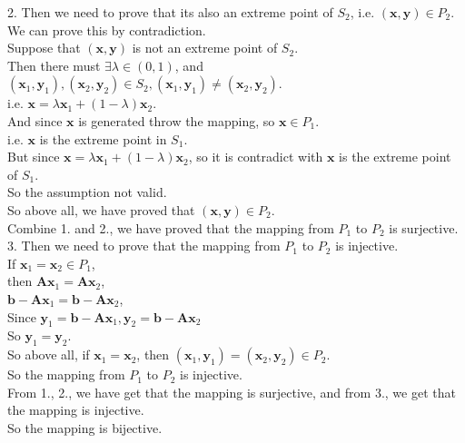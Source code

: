 \documentclass[10pt]{article}
\renewcommand{\mathbf}{\boldsymbol}
\begin{document}
2. Then we need to prove that its also an extreme point of $S_2$, i.e. $(\mathbf{x},\mathbf{y})\in P_2$.\\
We can prove this by contradiction.\\
Suppose that $(\mathbf{x},\mathbf{y})$ is not an extreme point of $S_2$.\\
Then there must $\exists\lambda\in(0,1)$, and $(\mathbf{x}_1,\mathbf{y}_1),(\mathbf{x}_2,\mathbf{y}_2)\in S_2, (\mathbf{x}_1,\mathbf{y}_1)\neq(\mathbf{x}_2,\mathbf{y}_2)$.\\
i.e. $\mathbf{x}=\lambda\mathbf{x}_1+(1-\lambda)\mathbf{x}_2$.\\
And since $\mathbf{x}$ is generated throw the mapping, so $\mathbf{x}\in P_1$.\\
i.e. $\mathbf{x}$ is the extreme point in $S_1$.\\
But since $\mathbf{x}=\lambda\mathbf{x}_1+(1-\lambda)\mathbf{x}_2$, so it is contradict with $\mathbf{x}$ is the extreme point of $S_1$.\\
So the assumption not valid.\\
So above all, we have proved that $(\mathbf{x},\mathbf{y})\in P_2$.\\

Combine 1. and 2., we have proved that the mapping from $P_1$ to $P_2$ is surjective.\\

3. Then we need to prove that the mapping from $P_1$ to $P_2$ is injective.\\
If $\mathbf{x}_1=\mathbf{x}_2\in P_1$,\\
then $\mathbf{A}\mathbf{x}_1=\mathbf{A}\mathbf{x}_2$,\\
$\mathbf{b}-\mathbf{A}\mathbf{x}_1=\mathbf{b}-\mathbf{A}\mathbf{x}_2$,\\
Since $\mathbf{y}_1=\mathbf{b}-\mathbf{A}\mathbf{x}_1,\mathbf{y}_2=\mathbf{b}-\mathbf{A}\mathbf{x}_2$\\
So $\mathbf{y}_1=\mathbf{y}_2$.\\
So above all, if $\mathbf{x}_1=\mathbf{x}_2$, then $(\mathbf{x}_1,\mathbf{y}_1)=(\mathbf{x}_2,\mathbf{y}_2)\in P_2$.\\
So the mapping from $P_1$ to $P_2$ is injective.\\

From 1., 2., we have get that the mapping is surjective, and from 3., we get that the mapping is injective.\\
So the mapping is bijective.\\
\end{document}
